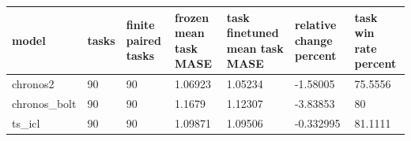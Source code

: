 \begin{tabular}{lllllll}
\toprule
model & tasks & finite paired tasks & frozen mean task MASE & task finetuned mean task MASE & relative change percent & task win rate percent \\
\midrule
chronos2 & 90 & 90 & 1.06923 & 1.05234 & -1.58005 & 75.5556 \\
chronos\_bolt & 90 & 90 & 1.1679 & 1.12307 & -3.83853 & 80 \\
ts\_icl & 90 & 90 & 1.09871 & 1.09506 & -0.332995 & 81.1111 \\
\bottomrule
\end{tabular}
